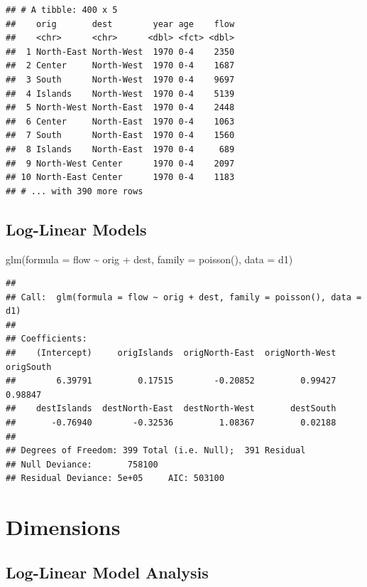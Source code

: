 \documentclass[
]{book}
\newenvironment{Shaded}{\begin{snugshade}}{\end{snugshade}}
\newcommand{\AttributeTok}[1]{\textcolor[rgb]{0.77,0.63,0.00}{#1}}
\newcommand{\FunctionTok}[1]{\textcolor[rgb]{0.00,0.00,0.00}{#1}}
\newcommand{\NormalTok}[1]{#1}
\newcommand{\SpecialCharTok}[1]{\textcolor[rgb]{0.00,0.00,0.00}{#1}}
\begin{document}
\begin{verbatim}
## # A tibble: 400 x 5
##    orig       dest        year age    flow
##    <chr>      <chr>      <dbl> <fct> <dbl>
##  1 North-East North-West  1970 0-4    2350
##  2 Center     North-West  1970 0-4    1687
##  3 South      North-West  1970 0-4    9697
##  4 Islands    North-West  1970 0-4    5139
##  5 North-West North-East  1970 0-4    2448
##  6 Center     North-East  1970 0-4    1063
##  7 South      North-East  1970 0-4    1560
##  8 Islands    North-East  1970 0-4     689
##  9 North-West Center      1970 0-4    2097
## 10 North-East Center      1970 0-4    1183
## # ... with 390 more rows
\end{verbatim}

\hypertarget{log-linear-models-4}{%
\subsection{Log-Linear Models}\label{log-linear-models-4}}

\begin{Shaded}
\begin{Highlighting}[]
\FunctionTok{glm}\NormalTok{(}\AttributeTok{formula =}\NormalTok{ flow }\SpecialCharTok{\textasciitilde{}}\NormalTok{ orig }\SpecialCharTok{+}\NormalTok{ dest, }\AttributeTok{family =} \FunctionTok{poisson}\NormalTok{(), }\AttributeTok{data =}\NormalTok{ d1)}
\end{Highlighting}
\end{Shaded}

\begin{verbatim}
## 
## Call:  glm(formula = flow ~ orig + dest, family = poisson(), data = d1)
## 
## Coefficients:
##    (Intercept)     origIslands  origNorth-East  origNorth-West       origSouth  
##        6.39791         0.17515        -0.20852         0.99427         0.98847  
##    destIslands  destNorth-East  destNorth-West       destSouth  
##       -0.76940        -0.32536         1.08367         0.02188  
## 
## Degrees of Freedom: 399 Total (i.e. Null);  391 Residual
## Null Deviance:       758100 
## Residual Deviance: 5e+05     AIC: 503100
\end{verbatim}

\hypertarget{dimensions}{%
\section{Dimensions}\label{dimensions}}

\hypertarget{log-linear-model-analysis}{%
\subsection{Log-Linear Model Analysis}\label{log-linear-model-analysis}}
\end{document}
